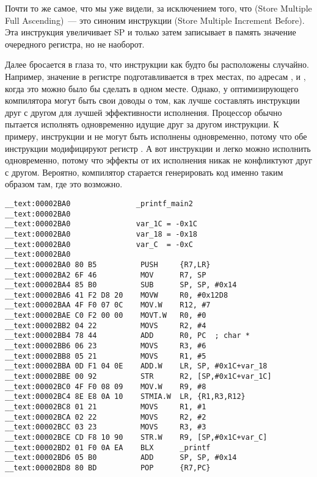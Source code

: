 Почти то же самое, что мы уже видели, за исключением того, что  (Store Multiple Full Ascending)~--- 
это синоним инструкции  (Store Multiple Increment Before). 
Эта инструкция увеличивает \ac{SP} и только затем записывает в память значение очередного регистра, но не наоборот.

Далее бросается в глаза то, что инструкции как будто бы расположены случайно.
Например, значение в регистре  подготавливается в трех местах, по адресам ,  и , 
когда это можно было бы сделать в одном месте.
Однако, у оптимизирующего компилятора могут быть свои доводы о том, как лучше составлять инструкции 
друг с другом для лучшей эффективности исполнения.
Процессор обычно пытается исполнять одновременно идущие друг за другом инструкции.
К примеру, инструкции  и  не могут быть исполнены одновременно,
потому что обе инструкции модифицируют регистр . 
А вот инструкции  и  легко можно исполнить одновременно, 
потому что эффекты от их исполнения никак не конфликтуют друг с другом.
Вероятно, компилятор старается генерировать код именно таким образом там, где это возможно.
 
\subsubsectionold{\OptimizingXcodeIV: \ThumbTwoMode}

\begin{lstlisting}
__text:00002BA0               _printf_main2
__text:00002BA0
__text:00002BA0               var_1C = -0x1C
__text:00002BA0               var_18 = -0x18
__text:00002BA0               var_C  = -0xC
__text:00002BA0
__text:00002BA0 80 B5          PUSH     {R7,LR}
__text:00002BA2 6F 46          MOV      R7, SP
__text:00002BA4 85 B0          SUB      SP, SP, #0x14
__text:00002BA6 41 F2 D8 20    MOVW     R0, #0x12D8
__text:00002BAA 4F F0 07 0C    MOV.W    R12, #7
__text:00002BAE C0 F2 00 00    MOVT.W   R0, #0
__text:00002BB2 04 22          MOVS     R2, #4
__text:00002BB4 78 44          ADD      R0, PC  ; char *
__text:00002BB6 06 23          MOVS     R3, #6
__text:00002BB8 05 21          MOVS     R1, #5
__text:00002BBA 0D F1 04 0E    ADD.W    LR, SP, #0x1C+var_18
__text:00002BBE 00 92          STR      R2, [SP,#0x1C+var_1C]
__text:00002BC0 4F F0 08 09    MOV.W    R9, #8
__text:00002BC4 8E E8 0A 10    STMIA.W  LR, {R1,R3,R12}
__text:00002BC8 01 21          MOVS     R1, #1
__text:00002BCA 02 22          MOVS     R2, #2
__text:00002BCC 03 23          MOVS     R3, #3
__text:00002BCE CD F8 10 90    STR.W    R9, [SP,#0x1C+var_C]
__text:00002BD2 01 F0 0A EA    BLX      _printf
__text:00002BD6 05 B0          ADD      SP, SP, #0x14
__text:00002BD8 80 BD          POP      {R7,PC}
\end{lstlisting}


